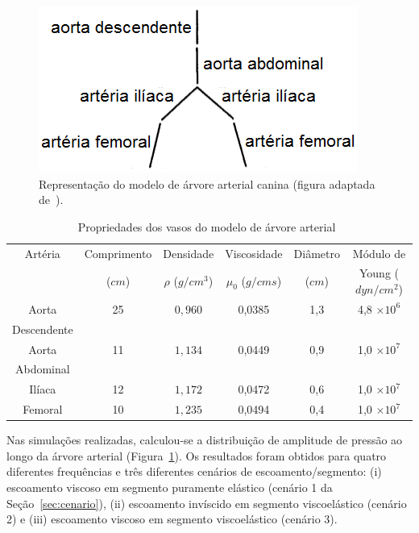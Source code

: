 \begin{figure}[!htbp]
	\centering
	\includegraphics[scale=0.8]{Figures/tree_canine.png}
	\caption{Representação do modelo de árvore arterial canina (figura adaptada de~\cite{Duan}).}
	\label{fig:arvore-canina}
\end{figure}

\begin{table}[!htbp]
	\caption{Propriedades dos vasos do modelo de árvore arterial~\cite{Duan,Fung}}
	\centering{}
	\begin{tabular}{c|c|c|c|c|c}
		\toprule 
		Artéria	& Comprimento & Densidade & Viscosidade  & Diâmetro & Módulo de  \\ 
		& ($cm$) & $\rho$ ($g/cm^3$) & $\mu_0$ ($g/cm s$) & ($cm$) & Young ($dyn/cm^2$) \\ 
		\midrule 
		Aorta & 25 & $0,960$ & 0,0385 & 1,3 &4,8 $\times 10^6$ \\ 
		Descendente &  & &  & & \\ 
		\hline 
		Aorta & 11 & $1,134$ & 0,0449 & 0,9 & 1,0 $\times 10^7$ \\
		Abdominal &  & &  & &  \\ 
		\hline 
		Ilíaca & 12 & $1,172$ & 0,0472 & 0,6 & 1,0 $\times 10^7$\\ 
		\hline 
		Femoral & 10 & $1,235$ & 0,0494 & 0,4 & 1,0 $\times 10^7$\\ 
		\bottomrule 
	\end{tabular} 
	\label{tab1:proprerty}
\end{table}

Nas simulações realizadas, calculou-se a distribuição de amplitude de pressão ao longo da árvore arterial (Figura~\ref{fig:arvore-canina}). Os resultados foram obtidos para quatro diferentes frequên\-cias e três diferentes cenários de escoamento/segmento: (i) escoamento viscoso em segmento puramente elástico (cenário 1 da Seção~\ref{sec:cenario}), (ii) escoamento invíscido em segmento viscoelástico (cenário 2) e (iii) escoamento viscoso em segmento viscoelástico (cenário 3). 

